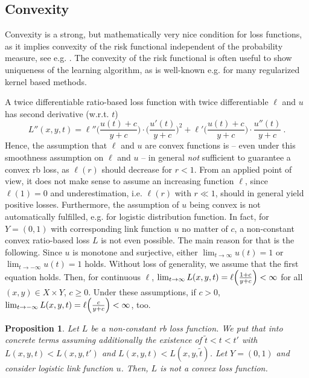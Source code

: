 \documentclass[10pt]{article}
\newcommand{\XY}{X \times Y}
\newtheorem{proposition}[theorem]{Proposition}
\begin{document}
\subsection{Convexity} 
Convexity is a strong, but mathematically very nice condition for loss functions, as it implies convexity of the risk functional independent of the probability measure, see e.g. \cite[Lem. 2.13]{SC08}. 
The convexity of the risk functional is often useful to show uniqueness of the learning algorithm, as is well-known e.g. for many regularized kernel based methods. \par
A twice differentiable ratio-based loss function with twice differentiable $\ell$ and $u$ has second derivative (w.r.t. $t$)
\begin{equation*} 
	L''(x,y,t) = \ell''\biggl( \frac{u(t) + c}{y + c}\biggr) \cdot \biggl(\frac{u'(t)}{y + c}\biggr)^2 + \ell'\biggl(\frac{u(t) + c}{y + c}\biggr) \cdot \frac{u''(t)}{y + c} ~.
\end{equation*}
Hence, the assumption that $\ell$ and $u$ are convex functions is -- even under this smoothness assumption on $\ell$ and $u$ -- in general \emph{not} sufficient to guarantee a convex rb loss, as $\ell(r)$ should decrease for $r < 1$. 
From an applied point of view, it does not make sense to assume an increasing function $\ell$, since $\ell(1)=0$ and underestimation, i.e. $\ell(r)$ with $r \ll 1$, should in general yield positive losses.
Furthermore, the assumption of $u$ being convex is not automatically fulfilled, e.g. for logistic distribution function.
In fact, for $Y = (0, 1)$ with corresponding link function $u$ no matter of $c$, a non-constant convex ratio-based loss $L$ is not even possible.
The main reason for that is the following. 
Since $u$ is monotone and surjective, either $\lim_{t\to \infty} u(t) = 1$ or $\lim_{t \to -\infty} u(t) = 1$ holds. 
Without loss of generality, we assume that the first equation holds.
Then, for continuous $\ell$, $\lim_{t \to \infty} L(x,y,t) = \ell \Bigl(\frac{1+c}{y+c}\Bigr) < \infty$ for all $(x,y) \in \XY$, $c \geq 0$.
Under these assumptions, if $c > 0$, $\lim_{t \to -\infty} L(x,y,t) = \ell\Bigl(\frac{c}{y+c}\Bigr) < \infty$, too.
\begin{proposition} \label{PropNoConvexLoss}
	Let $L$ be a non-constant rb loss function. 
	We put that into concrete terms assuming additionally the existence of $\tilde{t} < t < t'$ with $L(x,y,t) < L(x,y,t')$ and $L(x,y,t) < L(x,y,\tilde{t})$. 
	Let $Y = (0,1)$ and consider logistic link function $u$. 
	Then, $L$ is not a convex loss function.
\end{proposition}
\end{document}
